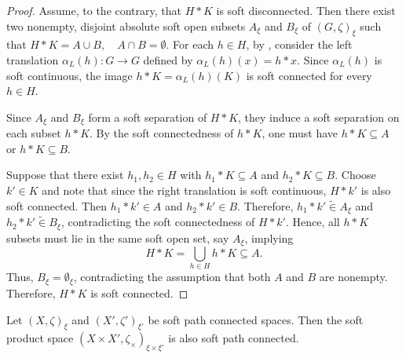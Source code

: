 \documentclass[preprint,12pt]{elsarticle}
\begin{document}
\begin{proof}
Assume, to the contrary, that $H\ast K$ is soft disconnected.
Then there exist two nonempty, disjoint absolute soft open subsets
$A_\xi$ and $B_\xi$ of \( (G,\zeta)_\xi  \) such that $H\ast K = A \cup B, \quad A \cap B = \emptyset$.
For each $h\in H$, by \cite[Propsition 4.5]{Hida}, consider the left translation
$\alpha_L(h):G\to G$ defined by $\alpha_L(h)(x)=h\ast x$.
Since $\alpha_L(h)$ is  soft continuous,
the image $h\ast K=\alpha_L(h)(K)$ is soft connected for every $h\in H$.

Since $A_\xi$ and $B_\xi$ form a soft separation of $H\ast K$,
they induce a soft separation on each subset $h\ast K$.
By the soft connectedness of $h\ast K$, one must have
$h\ast K\subseteq A$ or $h\ast K\subseteq B$.

Suppose that there exist $h_1,h_2\in H$ with $h_1\ast K\subseteq A$
and $h_2\ast K\subseteq B$.
Choose $k'\in K$ and note that since the right translation is soft continuous, $H\ast k'$ is also soft connected.
Then $h_1\ast k'\in A$ and $h_2\ast k'\in B$. Therefore,  $h_1\ast k'\widetilde{\in} A_\xi$ and $h_2\ast k'\widetilde{\in} B_\xi$,
contradicting the soft connectedness of $H\ast k'$.
Hence, all $h\ast K$ subsets must lie in the same soft open set,
say $A_\xi$, implying
\[
H\ast K=\bigcup_{h\in H}h\ast K\subseteq A.
\]
Thus, $B_\xi=\emptyset_\xi$, contradicting the assumption that both
$A$ and $B$ are nonempty.
Therefore, $H\ast K$ is soft connected.
\end{proof}

\begin{thm}\label{softpathproduct}
Let $(X,\zeta)_\xi$ and $(X',\zeta')_{\xi'}$ be soft path connected spaces.
Then the soft product space $(X\times X',\zeta_\times )_{\xi\times \xi'}$ is also soft path connected.
\end{thm}
\end{document}
